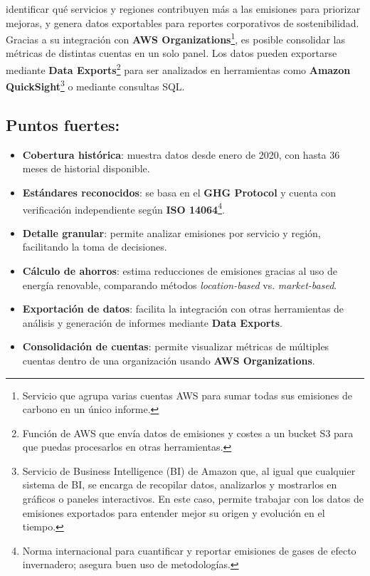 \documentclass[12pt,a4paper]{report}
\begin{document}
identificar qué servicios y regiones contribuyen más a las emisiones para
priorizar mejoras, y genera datos exportables para reportes corporativos de
sostenibilidad. Gracias a su integración con \textbf{AWS Organizations}\footnote{Servicio que agrupa varias cuentas AWS para sumar todas sus emisiones de carbono en un único informe.}, es
posible consolidar las métricas de distintas cuentas en un solo panel. Los
datos pueden exportarse mediante \textbf{Data Exports}\footnote{Función de AWS que envía datos de emisiones y costes a un bucket S3 para que puedas procesarlos en otras herramientas.} para ser analizados en
herramientas como \textbf{Amazon QuickSight}\footnote{Servicio de Business Intelligence (BI) de Amazon que, al igual que cualquier sistema de BI, se encarga de recopilar datos, analizarlos y mostrarlos en gráficos o paneles interactivos. En este caso, permite trabajar con los datos de emisiones exportados para entender mejor su origen y evolución en el tiempo.} o mediante consultas SQL.
\subsection*{Puntos fuertes:}
\begin{itemize}
  \item \textbf{Cobertura histórica}: muestra datos desde enero de 2020, con hasta 36 meses de historial disponible.
  \item \textbf{Estándares reconocidos}: se basa en el \textbf{GHG Protocol} y cuenta con verificación independiente según \textbf{ISO 14064}\footnote{Norma internacional para cuantificar y reportar emisiones de gases de efecto invernadero; asegura buen uso de metodologías.}.
  \item \textbf{Detalle granular}: permite analizar emisiones por servicio y región, facilitando la toma de decisiones.
  \item \textbf{Cálculo de ahorros}: estima reducciones de emisiones gracias al uso de energía renovable, comparando métodos \textit{location-based} vs. \textit{market-based}.
  \item \textbf{Exportación de datos}: facilita la integración con otras herramientas de análisis y generación de informes mediante \textbf{Data Exports}.
  \item \textbf{Consolidación de cuentas}: permite visualizar métricas de múltiples cuentas dentro de una organización usando \textbf{AWS Organizations}.
\end{itemize}
\end{document}
